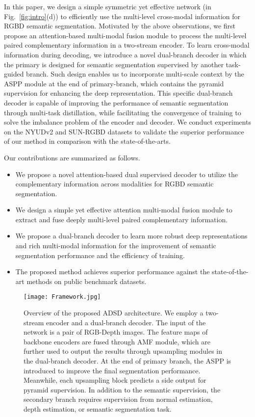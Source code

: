 \documentclass[10pt,twocolumn,letterpaper]{article}
\begin{document}
In this paper, we design a simple symmetric yet effective network (in Fig.~\ref{fig:intro}(d)) to efficiently use the multi-level cross-modal information for RGBD semantic segmentation. Motivated by the above observations, we first propose an attention-based multi-modal fusion module to process the multi-level paired complementary information in a two-stream encoder. To learn cross-modal information during decoding, we introduce a novel dual-branch decoder in which the primary is designed for semantic segmentation supervised by another task-guided branch. Such design enables us to incorporate multi-scale context by the ASPP module at the end of primary-branch, which contains the pyramid supervision for enhancing the deep representation. This specific dual-branch decoder is capable of improving the performance of semantic segmentation through multi-task distillation, while facilitating the convergence of training to solve the imbalance problem of the encoder and decoder. We conduct experiments on the NYUDv2 and SUN-RGBD datasets to validate the superior performance of our method in comparison with the state-of-the-arts.


Our contributions are summarized as follows.

\begin{itemize}
	\item{We propose a novel attention-based dual supervised decoder to utilize the complementary information across modalities for RGBD semantic segmentation.}
	
	\item{ We design a simple yet effective attention multi-modal fusion module to extract and fuse deeply multi-level paired complementary information.}
	
	\item{ We propose a dual-branch decoder to learn more robust deep representations and rich multi-modal information for the improvement of semantic segmentation performance and the efficiency of training. }
	
	\item{ The proposed method achieves superior performance against the state-of-the-art methods on public benchmark datasets.}
\end{itemize}

\begin{figure*}[!t]
	\centering
	\texttt{[image: Framework.jpg]}
	\caption{Overview of the proposed ADSD architecture. We employ a two-stream encoder and a dual-branch decoder. The input of the network is a pair of RGB-Depth images. The feature maps of backbone encoders are fused through AMF module, which are further used to output the results through upsampling modules in the dual-branch decoder. At the end of primary branch, the ASPP is introduced to improve the final segmentation performance. Meanwhile, each upsampling block predicts a side output for pyramid supervision. In addition to the semantic supervision, the secondary branch requires supervision from normal estimation, depth estimation, or semantic segmentation task.}
	\label{Fig:framework}
\end{figure*}
\end{document}
